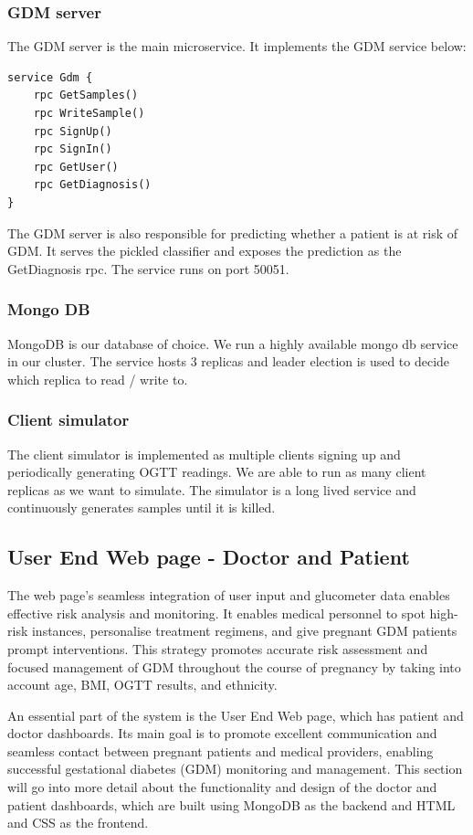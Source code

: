 \documentclass[conference,compsoc]{IEEEtran}
\begin{document}
\subsubsection{GDM server}
The GDM server is the main microservice. It implements the GDM service below: 

\begin{lstlisting}
service Gdm {
    rpc GetSamples()
    rpc WriteSample()
    rpc SignUp()
    rpc SignIn()
    rpc GetUser()
    rpc GetDiagnosis()
}
\end{lstlisting}

The GDM server is also responsible for predicting whether a patient is at risk of GDM. It serves the pickled classifier and exposes the prediction as the GetDiagnosis rpc. The service runs on port 50051.

\subsubsection{Mongo DB }
MongoDB is our database of choice. We run a highly available mongo db service in our cluster. The service hosts 3 replicas and leader election is used to decide which replica to read / write to.

\subsubsection{Client simulator}
The client simulator is implemented as multiple clients signing up and periodically generating OGTT readings. We are able to run as many client replicas as we want to simulate. The simulator is a long lived service and continuously generates samples until it is killed.


\subsection{User End Web page - Doctor and Patient}
The web page's seamless integration of user input and glucometer data enables effective risk analysis and monitoring. It enables medical personnel to spot high-risk instances, personalise treatment regimens, and give pregnant GDM patients prompt interventions. This strategy promotes accurate risk assessment and focused management of GDM throughout the course of pregnancy by taking into account age, BMI, OGTT results, and ethnicity.

An essential part of the system is the User End Web page, which has patient and doctor dashboards. Its main goal is to promote excellent communication and seamless contact between pregnant patients and medical providers, enabling successful gestational diabetes (GDM) monitoring and management. This section will go into more detail about the functionality and design of the doctor and patient dashboards, which are built using MongoDB as the backend and HTML and CSS as the frontend.
\end{document}
